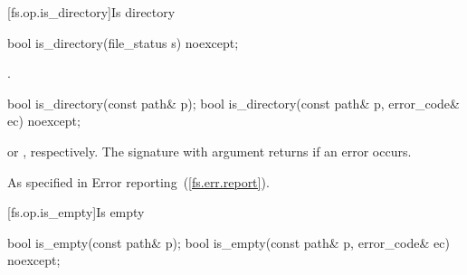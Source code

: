 [fs.op.is_directory]{Is directory}

%
\begin{itemdecl}
bool is_directory(file_status s) noexcept;
\end{itemdecl}

\begin{itemdescr}
\pnum
\returns {}.
\end{itemdescr}

%
\begin{itemdecl}
bool is_directory(const path& p);
bool is_directory(const path& p, error_code& ec) noexcept;
\end{itemdecl}

\begin{itemdescr}
\pnum
\returns {} or ,
  respectively. The signature with argument
   returns  if an error occurs.

\pnum
\throws As specified in Error reporting~(\ref{fs.err.report}).
\end{itemdescr}


[fs.op.is_empty]{Is empty}

%
\begin{itemdecl}
bool is_empty(const path& p);
bool is_empty(const path& p, error_code& ec) noexcept;
\end{itemdecl}

